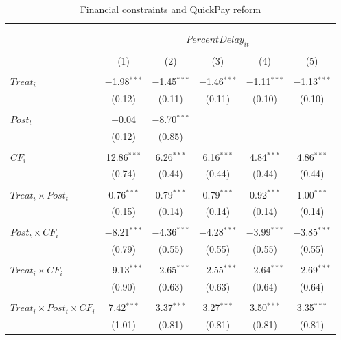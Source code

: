 \documentclass[
]{article}
\begin{document}
\begin{table}[H] \centering 
  \caption{Financial constraints and QuickPay reform} 
  \label{} 
\small 
\begin{tabular}{@{\extracolsep{-2pt}}lccccc} 
\\[-1.8ex]\hline 
\hline \\[-1.8ex] 
\\[-1.8ex] & \multicolumn{5}{c}{$PercentDelay_{it}$  } \\ 
\\[-1.8ex] & (1) & (2) & (3) & (4) & (5)\\ 
\hline \\[-1.8ex] 
 $Treat_i$ & $-$1.98$^{***}$ & $-$1.45$^{***}$ & $-$1.46$^{***}$ & $-$1.11$^{***}$ & $-$1.13$^{***}$ \\ 
  & (0.12) & (0.11) & (0.11) & (0.10) & (0.10) \\ 
  & & & & & \\ 
 $Post_t$ & $-$0.04 & $-$8.70$^{***}$ &  &  &  \\ 
  & (0.12) & (0.85) &  &  &  \\ 
  & & & & & \\ 
 $CF_i$ & 12.86$^{***}$ & 6.26$^{***}$ & 6.16$^{***}$ & 4.84$^{***}$ & 4.86$^{***}$ \\ 
  & (0.74) & (0.44) & (0.44) & (0.44) & (0.44) \\ 
  & & & & & \\ 
 $Treat_i \times Post_t$ & 0.76$^{***}$ & 0.79$^{***}$ & 0.79$^{***}$ & 0.92$^{***}$ & 1.00$^{***}$ \\ 
  & (0.15) & (0.14) & (0.14) & (0.14) & (0.14) \\ 
  & & & & & \\ 
 $Post_t \times CF_i$ & $-$8.21$^{***}$ & $-$4.36$^{***}$ & $-$4.28$^{***}$ & $-$3.99$^{***}$ & $-$3.85$^{***}$ \\ 
  & (0.79) & (0.55) & (0.55) & (0.55) & (0.55) \\ 
  & & & & & \\ 
 $Treat_i \times CF_i$ & $-$9.13$^{***}$ & $-$2.65$^{***}$ & $-$2.55$^{***}$ & $-$2.64$^{***}$ & $-$2.69$^{***}$ \\ 
  & (0.90) & (0.63) & (0.63) & (0.64) & (0.64) \\ 
  & & & & & \\ 
 $Treat_i \times Post_t \times CF_i$ & 7.42$^{***}$ & 3.37$^{***}$ & 3.27$^{***}$ & 3.50$^{***}$ & 3.35$^{***}$ \\ 
  & (1.01) & (0.81) & (0.81) & (0.81) & (0.81) \\ 

\end{tabular}
\end{table}
\end{document}

